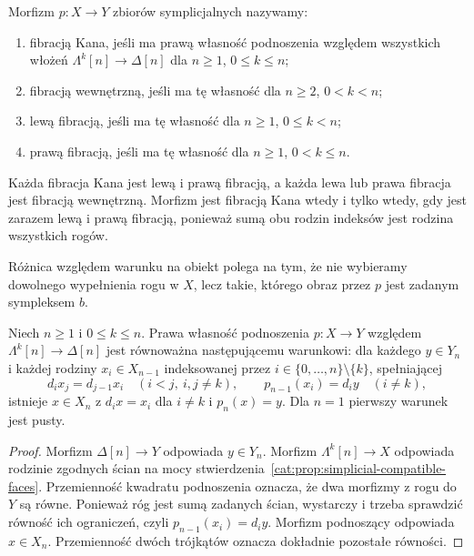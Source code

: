 \begin{definicja}\label{cat:def:simplicial-fibrations}
Morfizm $p:X\to Y$ zbiorów symplicjalnych nazywamy:
\begin{enumerate}
 \item fibracją Kana, jeśli ma prawą własność podnoszenia względem wszystkich włożeń $\Lambda^k[n]\to\Delta[n]$ dla $n\geq1$, $0\leq k\leq n$;
 \item fibracją wewnętrzną, jeśli ma tę własność dla $n\geq2$, $0<k<n$;
 \item lewą fibracją, jeśli ma tę własność dla $n\geq1$, $0\leq k<n$;
 \item prawą fibracją, jeśli ma tę własność dla $n\geq1$, $0<k\leq n$.
\end{enumerate}
\end{definicja}
Każda fibracja Kana jest lewą i prawą fibracją, a każda lewa lub prawa fibracja jest fibracją wewnętrzną. Morfizm jest fibracją Kana wtedy i tylko wtedy, gdy jest zarazem lewą i prawą fibracją, ponieważ sumą obu rodzin indeksów jest rodzina wszystkich rogów.

\begin{center}
\end{center}
Różnica względem warunku na obiekt polega na tym, że nie wybieramy dowolnego wypełnienia rogu w $X$, lecz takie, którego obraz przez $p$ jest zadanym sympleksem $b$.

\begin{stwierdzenie}\label{cat:prop:relative-horn-condition}
Niech $n\geq1$ i $0\leq k\leq n$. Prawa własność podnoszenia $p:X\to Y$ względem $\Lambda^k[n]\to\Delta[n]$ jest równoważna następującemu warunkowi: dla każdego $y\in Y_n$ i każdej rodziny $x_i\in X_{n-1}$ indeksowanej przez $i\in\{0,\ldots,n\}\setminus\{k\}$, spełniającej
\[
 d_i x_j=d_{j-1}x_i\quad(i<j,\ i,j\ne k),\qquad
 p_{n-1}(x_i)=d_i y\quad(i\ne k),
\]
istnieje $x\in X_n$ z $d_i x=x_i$ dla $i\ne k$ i $p_n(x)=y$. Dla $n=1$ pierwszy warunek jest pusty.
\end{stwierdzenie}
\begin{proof}
Morfizm $\Delta[n]\to Y$ odpowiada $y\in Y_n$. Morfizm $\Lambda^k[n]\to X$ odpowiada rodzinie zgodnych ścian na mocy stwierdzenia~\ref{cat:prop:simplicial-compatible-faces}. Przemienność kwadratu podnoszenia oznacza, że dwa morfizmy z rogu do $Y$ są równe. Ponieważ róg jest sumą zadanych ścian, wystarczy i trzeba sprawdzić równość ich ograniczeń, czyli $p_{n-1}(x_i)=d_i y$. Morfizm podnoszący odpowiada $x\in X_n$. Przemienność dwóch trójkątów oznacza dokładnie pozostałe równości.
\end{proof}

